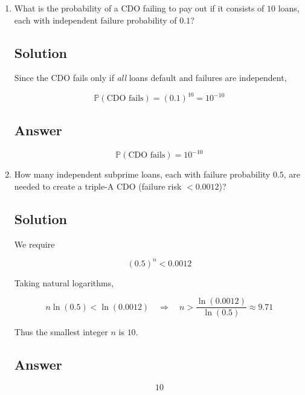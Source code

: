 \documentclass[12pt]{article}
\newcommand{\bP}{\mathbb{P}}
\begin{document}
	\begin{enumerate}[start=1,label={\bfseries Part \arabic*:},leftmargin=0in]
		\bigskip\item What is the probability of a CDO failing to pay out if it consists of $10$ loans, each with independent failure probability of $0.1$?
		
		\subsection*{Solution}
		
			Since the CDO fails only if \emph{all} loans default and failures are independent,
			
			\[
				\bP(\text{CDO fails}) = (0.1)^{10} = 10^{-10}
			\]
		
		\subsection*{Answer}
		
			\[\boxed{\bP(\text{CDO fails}) = 10^{-10}}\]
		
		\bigskip\item How many independent subprime loans, each with failure probability $0.5$, are needed to create a triple-A CDO (failure risk $< 0.0012$)?
		
		\subsection*{Solution}
		
			We require
			
			\[
				(0.5)^n < 0.0012
			\]
			
			Taking natural logarithms,
			
			\[
				n\ln(0.5) < \ln(0.0012)
				\quad\Longrightarrow\quad
				n > \frac{\ln(0.0012)}{\ln(0.5)} \approx 9.71
			\]
			
			Thus the smallest integer $n$ is $10$.
		
		\subsection*{Answer}
		
			\[\boxed{10}\]
	\end{enumerate}
	
\end{document}
